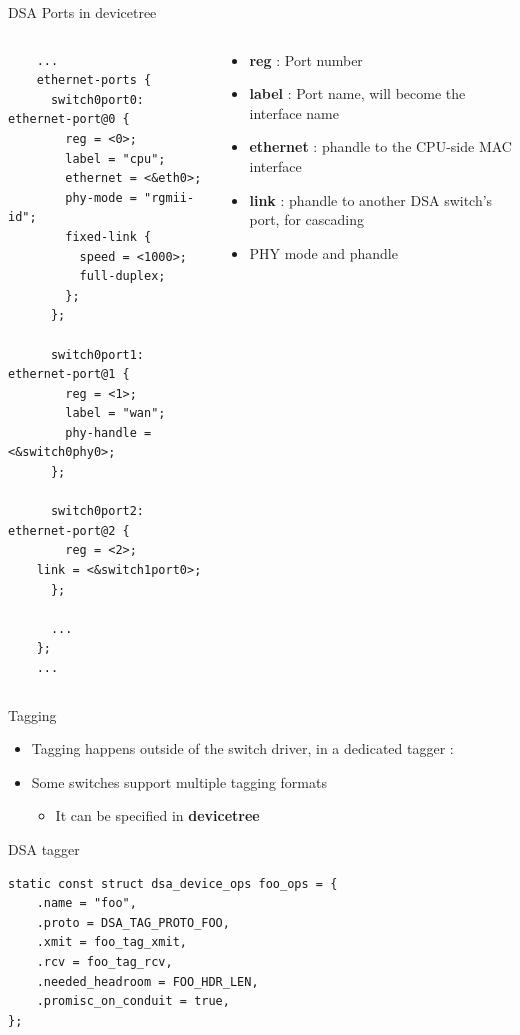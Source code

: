 \begin{frame}[fragile]{DSA Ports in devicetree}
	\begin{columns}
		\begin{column}{0.5\textwidth}

\tiny
			\begin{block}{}
\begin{verbatim}
    ...
    ethernet-ports {
      switch0port0: ethernet-port@0 {
        reg = <0>;
        label = "cpu";
        ethernet = <&eth0>;
        phy-mode = "rgmii-id";
        fixed-link {
          speed = <1000>;
          full-duplex;
        };
      };
      
      switch0port1: ethernet-port@1 {
        reg = <1>;
        label = "wan";
        phy-handle = <&switch0phy0>;
      };

      switch0port2: ethernet-port@2 {
        reg = <2>;
	link = <&switch1port0>;
      };

      ...      
    };
    ...
\end{verbatim}
			\end{block}
		\end{column}
		\begin{column}{0.5\textwidth}
			\begin{itemize}
				\item \textbf{reg} : Port number
				\item \textbf{label} : Port name, will become the interface name
				\item \textbf{ethernet} : phandle to the CPU-side MAC interface
				\item \textbf{link} : phandle to another DSA switch's port, for cascading
				\item PHY mode and phandle
			\end{itemize}
		\end{column}
	\end{columns}
\end{frame}



\begin{frame}[fragile]{Tagging}
	\begin{itemize}
		\item Tagging happens outside of the switch driver, in a dedicated tagger : 
		\item Some switches support multiple tagging formats
			\begin{itemize}
				\item It can be specified in \textbf{devicetree}
			\end{itemize}
	\end{itemize}
	\begin{block}{DSA tagger}
		\begin{verbatim}
static const struct dsa_device_ops foo_ops = {
    .name = "foo",
    .proto = DSA_TAG_PROTO_FOO,
    .xmit = foo_tag_xmit,
    .rcv = foo_tag_rcv,
    .needed_headroom = FOO_HDR_LEN,
    .promisc_on_conduit = true,
};
		\end{verbatim}
	\end{block}
\end{frame}

